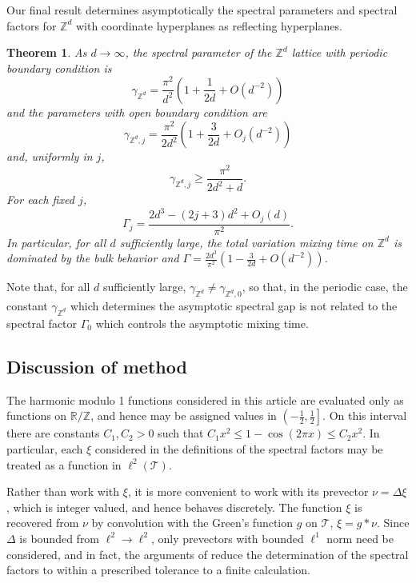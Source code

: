 \documentclass[a4paper, 12pt, notitlepage]{amsart}
\newcommand{\bR}{\mathbb{R}}
\newcommand{\zed}{\mathbb{Z}}
\newcommand{\sT}{\mathscr{T}}
\newtheorem{theorem}{Theorem}
\theoremstyle{remark}
\begin{document}
Our final result determines asymptotically the spectral parameters and spectral factors for $\zed^d$ with coordinate hyperplanes as reflecting hyperplanes. 
\begin{theorem}\label{asymptotic_theorem}
 As $d \to \infty$, the spectral parameter of the $\zed^d$ lattice with periodic boundary condition is
  \begin{equation}
  \gamma_{\zed^d} = \frac{\pi^2}{d^2}\left(1 + \frac{1}{2d} + O\left(d^{-2}\right)\right)
 \end{equation}
 and the parameters with open boundary condition are
\begin{equation}
 \gamma_{\zed^d,j} = \frac{\pi^2}{2d^2} \left(1 + \frac{3}{2d} + O_j\left(d^{-2}\right)\right)
\end{equation}
and, uniformly in $j$,
\begin{equation}
 \gamma_{\zed^d, j} \geq \frac{\pi^2}{2d^2 + d}.
\end{equation}
For each fixed $j$,
\begin{equation}
 \Gamma_j = \frac{2d^3 -(2j+3)d^2 + O_j(d)}{\pi^2}.
\end{equation}
In particular, for all $d$ sufficiently large, the total variation mixing time on $\zed^d$ is dominated by the bulk behavior and $\Gamma = \frac{2d^3}{\pi^2}\left(1 - \frac{3}{2d} + O\left(d^{-2}\right)\right)$.
\end{theorem}
Note that, for all $d$ sufficiently large,  $\gamma_{\zed^d} \neq \gamma_{\zed^d,0}$, so that, in the periodic case, the constant $\gamma_{\zed^d}$ which determines the asymptotic spectral gap is not related to the spectral factor $\Gamma_0$ which controls the asymptotic mixing time.

\subsection{Discussion of method}
The harmonic modulo 1 functions considered in this article are evaluated only as functions on $\bR/\zed$, and hence may be assigned values in $\left(-\frac{1}{2}, \frac{1}{2}\right]$. On this interval there are constants $C_1, C_2>0$ such that $C_1 x^2 \leq 1-\cos(2\pi x) \leq C_2 x^2$.  In particular, each $\xi$ considered in the definitions of the spectral factors may be treated as a function in $\ell^2(\sT)$.  

Rather than work with $\xi$, it is more convenient to work with its prevector $\nu = \Delta \xi$, which is integer valued, and hence behaves discretely. The function $\xi$ is recovered from $\nu$ by convolution with the Green's function $g$ on $\sT$, $\xi = g*\nu$.  Since $\Delta$ is bounded from $\ell^2 \to \ell^2$, only prevectors with bounded $\ell^1$ norm need be considered, and in fact, the arguments of \cite{HS19} reduce the determination of the spectral factors to within a prescribed tolerance to a finite calculation.
\end{document}

